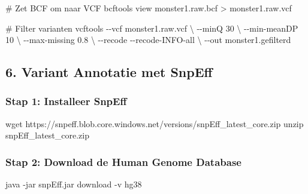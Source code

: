 \documentclass[
  letterpaper,
  DIV=11,
  numbers=noendperiod]{scrartcl}
\newenvironment{Shaded}{\begin{snugshade}}{\end{snugshade}}
\newcommand{\AttributeTok}[1]{\textcolor[rgb]{0.40,0.45,0.13}{#1}}
\newcommand{\CommentTok}[1]{\textcolor[rgb]{0.37,0.37,0.37}{#1}}
\newcommand{\DataTypeTok}[1]{\textcolor[rgb]{0.68,0.00,0.00}{#1}}
\newcommand{\ExtensionTok}[1]{\textcolor[rgb]{0.00,0.23,0.31}{#1}}
\newcommand{\FunctionTok}[1]{\textcolor[rgb]{0.28,0.35,0.67}{#1}}
\newcommand{\NormalTok}[1]{\textcolor[rgb]{0.00,0.23,0.31}{#1}}
\newcommand{\OperatorTok}[1]{\textcolor[rgb]{0.37,0.37,0.37}{#1}}
\begin{document}
\begin{Shaded}
\begin{Highlighting}[]
\CommentTok{\# Zet BCF om naar VCF}
\ExtensionTok{bcftools}\NormalTok{ view monster1.raw.bcf }\OperatorTok{\textgreater{}}\NormalTok{ monster1.raw.vcf}

\CommentTok{\# Filter varianten}
\ExtensionTok{vcftools} \AttributeTok{{-}{-}vcf}\NormalTok{ monster1.raw.vcf }\DataTypeTok{\textbackslash{}}
         \AttributeTok{{-}{-}minQ}\NormalTok{ 30 }\DataTypeTok{\textbackslash{}}
         \AttributeTok{{-}{-}min{-}meanDP}\NormalTok{ 10 }\DataTypeTok{\textbackslash{}}
         \AttributeTok{{-}{-}max{-}missing}\NormalTok{ 0.8 }\DataTypeTok{\textbackslash{}}
         \AttributeTok{{-}{-}recode} \AttributeTok{{-}{-}recode{-}INFO{-}all} \DataTypeTok{\textbackslash{}}
         \AttributeTok{{-}{-}out}\NormalTok{ monster1.gefilterd}
\end{Highlighting}
\end{Shaded}

\subsection{6. Variant Annotatie met
SnpEff}\label{variant-annotatie-met-snpeff}

\subsubsection{Stap 1: Installeer
SnpEff}\label{stap-1-installeer-snpeff}

\begin{Shaded}
\begin{Highlighting}[]
\FunctionTok{wget}\NormalTok{ https://snpeff.blob.core.windows.net/versions/snpEff\_latest\_core.zip}
\FunctionTok{unzip}\NormalTok{ snpEff\_latest\_core.zip}
\end{Highlighting}
\end{Shaded}

\subsubsection{Stap 2: Download de Human Genome
Database}\label{stap-2-download-de-human-genome-database}

\begin{Shaded}
\begin{Highlighting}[]
\ExtensionTok{java} \AttributeTok{{-}jar}\NormalTok{ snpEff.jar download }\AttributeTok{{-}v}\NormalTok{ hg38}
\end{Highlighting}
\end{Shaded}
\end{document}
